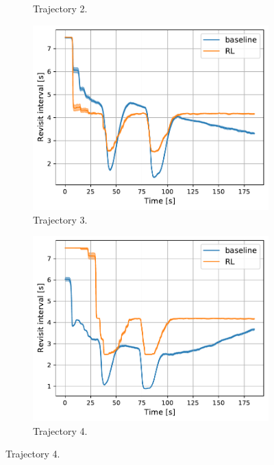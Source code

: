 \documentclass[english, 12pt, a4paper, elec, utf8, a-1b, online]{aaltothesis}
\begin{document}
\begin{figure}
\begin{subfigure}[b]{0.45\textwidth}
        \caption{Trajectory 2.}
        \label{fig:RI_T2}
    \end{subfigure}
    \hfill
    \begin{subfigure}[b]{0.45\textwidth}
        \centering
        \includegraphics[width=\linewidth]{figures/benchmark/Simulations/revisit_intervals_2.pdf}
        \caption{Trajectory 3.}
        \label{fig:RI_T3}
    \end{subfigure}
    \hfill
    \begin{subfigure}[b]{0.45\textwidth}
        \centering
        \includegraphics[width=\linewidth]{figures/benchmark/Simulations/revisit_intervals_3.pdf}
        \caption{Trajectory 4.}

\end{subfigure}
\end{figure}
\end{document}
